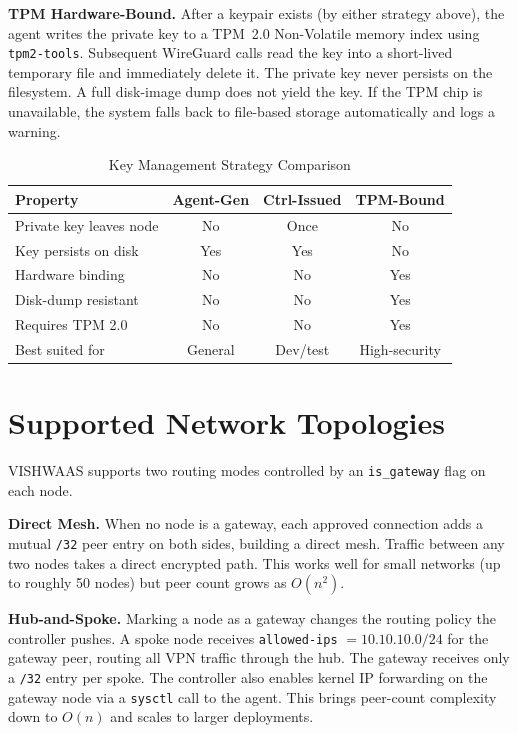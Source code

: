 \documentclass[conference]{IEEEtran}
\begin{document}
\textbf{TPM Hardware-Bound.} After a keypair exists (by either strategy
above), the agent writes the private key to a TPM~2.0 Non-Volatile memory
index using \texttt{tpm2-tools}. Subsequent WireGuard calls read the key
into a short-lived temporary file and immediately delete it. The private key
never persists on the filesystem. A full disk-image dump does not yield the
key. If the TPM chip is unavailable, the system falls back to file-based
storage automatically and logs a warning.

\begin{table}[!t]
\caption{Key Management Strategy Comparison}
\label{tab:keymanagement}
\centering
\begin{tabular}{lccc}
\toprule
\textbf{Property} & \textbf{Agent-Gen} & \textbf{Ctrl-Issued} & \textbf{TPM-Bound} \\
\midrule
Private key leaves node & No  & Once & No  \\
Key persists on disk    & Yes & Yes  & No  \\
Hardware binding        & No  & No   & Yes \\
Disk-dump resistant     & No  & No   & Yes \\
Requires TPM 2.0        & No  & No   & Yes \\
Best suited for         & General & Dev/test & High-security \\
\bottomrule
\end{tabular}
\end{table}


\section{Supported Network Topologies}
\label{sec:topology}

VISHWAAS supports two routing modes controlled by an \texttt{is\_gateway}
flag on each node.

\textbf{Direct Mesh.} When no node is a gateway, each approved connection
adds a mutual \texttt{/32} peer entry on both sides, building a direct mesh.
Traffic between any two nodes takes a direct encrypted path. This works
well for small networks (up to roughly 50 nodes) but peer count grows as
$O(n^2)$.

\textbf{Hub-and-Spoke.} Marking a node as a gateway changes the routing
policy the controller pushes. A spoke node receives \texttt{allowed-ips}
$= 10.10.10.0/24$ for the gateway peer, routing all VPN traffic through the
hub. The gateway receives only a \texttt{/32} entry per spoke. The
controller also enables kernel IP forwarding on the gateway node via a
\texttt{sysctl} call to the agent. This brings peer-count complexity down to
$O(n)$ and scales to larger deployments.
\end{document}
